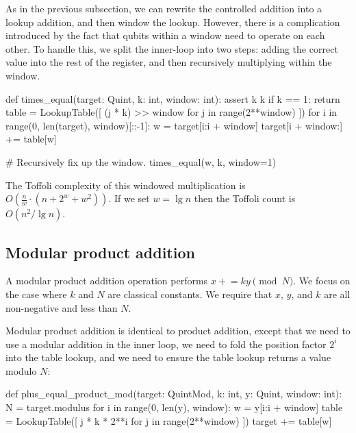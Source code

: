\documentclass[onecolumn,unpublished]{quantumarticle}
\theoremstyle{definition}
\theoremstyle{definition}
\theoremstyle{definition}
\newcommand{\pluseq}{\mathrel{+}=}
\begin{document}
As in the previous subsection, we can rewrite the controlled addition into a lookup addition, and then window the lookup.
However, there is a complication introduced by the fact that qubits within a window need to operate on each other.
To handle this, we split the inner-loop into two steps: adding the correct value into the rest of the register, and then recursively multiplying within the window.

\begin{python}
    def times_equal(target: Quint, k: int, window: int):
        assert k %
        k %
        if k == 1:
            return
        table = LookupTable([
            (j * k) >> window
            for j in range(2**window)
        ])
        for i in range(0, len(target), window)[::-1]:
            w = target[i:i + window]
            target[i + window:] += table[w]
    
            # Recursively fix up the window.
            times_equal(w, k, window=1)
\end{python}

The Toffoli complexity of this windowed multiplication is $O(\frac{n}{w} \cdot (n + 2^w + w^2))$.
If we set $w = \lg n$ then the Toffoli count is $O(n^2/\lg n)$.


\subsection{Modular product addition}

A modular product addition operation performs $x \pluseq k y \pmod{N}$.
We focus on the case where $k$ and $N$ are classical constants.
We require that $x$, $y$, and $k$ are all non-negative and less than $N$.

Modular product addition is identical to product addition, except that we need to use a modular addition in the inner loop, we need to fold the position factor $2^i$ into the table lookup, and we need to ensure the table lookup returns a value modulo $N$:

\begin{python}
    def plus_equal_product_mod(target: QuintMod,
                               k: int,
                               y: Quint,
                               window: int):
        N = target.modulus
        for i in range(0, len(y), window):
            w = y[i:i + window]
            table = LookupTable([
                j * k * 2**i %
                for j in range(2**window)
            ])
            target += table[w]
\end{python}
\end{document}
